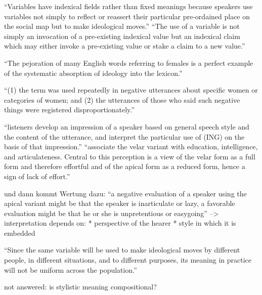 ``Variables have indexical fields rather than fixed meanings because speakers use
variables not simply to reflect or reassert their particular pre-ordained place
on the social map but to make ideological moves.''
``The use of a variable is not
simply an invocation of a pre-existing indexical value but an indexical claim
which may either invoke a pre-existing value or stake a claim to a new value.''

``The
pejoration of many English words referring to females is a perfect example of the
systematic absorption of ideology into the lexicon.''

``(1) the term was used
repeatedly in negative utterances about specific women or categories of women;
and (2) the utterances of those who said such negative things were registered
disproportionately.''

``listeners develop an impression of a speaker based on general speech
style and the content of the utterance, and interpret the particular use of (ING)
on the basis of that impression.''
``associate the velar variant with education, intelligence, and articulateness.
Central to this perception is a view of the velar form as a full form and therefore
effortful and of the apical form as a reduced form, hence a sign of lack of effort.''

und dann kommt Wertung dazu:
``a negative evaluation of a speaker using
the apical variant might be that the speaker is inarticulate or lazy, a favorable
evaluation might be that he or she is unpretentious or easygoing''
--> interpretation depends on:
* perspective of the hearer
* style in which it is embedded

``Since the same variable will be used to make ideological moves by different
people, in different situations, and to different purposes, its meaning in practice
will not be uniform across the population.''

not answered: is stylistic meaning compositional?


